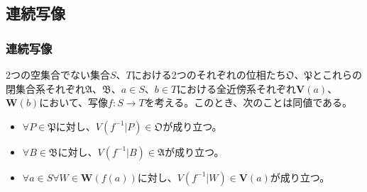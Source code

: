 \documentclass[dvipdfmx]{jsarticle}
\begin{document}
\subsection{連続写像}%
\subsubsection{連続写像}%
\begin{thm}\label{8.1.3.1}
2つの空集合でない集合$S$、$T$における2つのそれぞれの位相たち$\mathfrak{O}$、$\mathfrak{P}$とこれらの閉集合系それぞれ$\mathfrak{A}$、$\mathfrak{B}$、$a \in S$、$b \in T$における全近傍系それぞれ$\mathbf{V}(a)$、$\mathbf{W}(b)$において、写像$f:S \rightarrow T$を考える。このとき、次のことは同値である。
\begin{itemize}
\item
  $\forall P \in \mathfrak{P}$に対し、$V\left( f^{- 1}|P \right) \in \mathfrak{O}$が成り立つ。
\item
  $\forall B \in \mathfrak{B}$に対し、$V\left( f^{- 1}|B \right) \in \mathfrak{A}$が成り立つ。
\item
  $\forall a \in S\forall W \in \mathbf{W}\left( f(a) \right)$に対し、$V\left( f^{- 1}|W \right) \in \mathbf{V}(a)$が成り立つ。
\end{itemize}
\end{thm}
\end{document}
